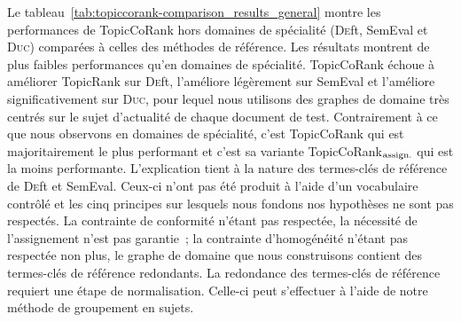         Le tableau~\ref{tab:topiccorank-comparison_results_general} montre les
        performances de TopicCoRank hors domaines de spécialité (\textsc{De}ft,
        SemEval et \textsc{Duc}) comparées à celles des méthodes de référence.
        Les résultats montrent de plus faibles performances qu'en domaines de
        spécialité. TopicCoRank échoue à améliorer TopicRank sur \textsc{De}ft,
        l'améliore légèrement sur SemEval et l'améliore significativement sur
        \textsc{Duc}, pour lequel nous utilisons des graphes de domaine très
        centrés sur le sujet d'actualité de chaque document de test.
        Contrairement à ce que nous observons en domaines de spécialité, c'est
        TopicCoRank qui est majoritairement le plus performant et c'est sa
        variante TopicCoRank$_\textnormal{assign.}$ qui est la moins
        performante. L'explication tient à la nature des termes-clés de
        référence de \textsc{De}ft et SemEval. Ceux-ci n'ont pas été produit à
        l'aide d'un vocabulaire contrôlé et les cinq principes sur lesquels nous
        fondons nos hypothèses ne sont pas respectés. La contrainte de
        conformité n'étant pas respectée, la nécessité de l'assignement n'est
        pas garantie~; la contrainte d'homogénéité n'étant pas respectée non
        plus, le graphe de domaine que nous construisons contient des
        termes-clés de référence redondants. La redondance des termes-clés de
        référence requiert une étape de normalisation. Celle-ci peut s'effectuer
        à l'aide de notre méthode de groupement en sujets.
